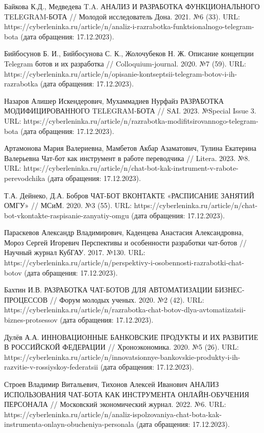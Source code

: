 \documentclass{article}
\begin{document}
Байкова К.Д., Медведева T.A. АНАЛИЗ И РАЗРАБОТКА ФУНКЦИОНАЛЬНОГО TELEGRAM-БОТА // Молодой исследователь Дона. 2021. №6 (33). URL: https://cyberleninka.ru/article/n/analiz-i-razrabotka-funktsionalnogo-telegram-bota (дата обращения: 17.12.2023).

Бийбосунов Б. И., Бийбосунова С. К., Жолочубеков Н. Ж. Описание концепции Telegram ботов и их разработка // Colloquium-journal. 2020. №7 (59). URL: https://cyberleninka.ru/article/n/opisanie-kontseptsii-telegram-botov-i-ih-razrabotka (дата обращения: 17.12.2023).

Назаров Алишер Искендерович, Мухаммадиев Нурфайз РАЗРАБОТКА МОДИФИЦИРОВАННОГО TELEGRAM-БОТА // SAI. 2023. №Special Issue 3. URL: https://cyberleninka.ru/article/n/razrabotka-modifitsirovannogo-telegram-bota (дата обращения: 17.12.2023).

Артамонова Мария Валериевна, Мамбетов Акбар Азаматович, Тулина Екатерина Валерьевна Чат-бот как инструмент в работе переводчика // Litera. 2023. №8. URL: https://cyberleninka.ru/article/n/chat-bot-kak-instrument-v-rabote-perevodchika (дата обращения: 17.12.2023).

Т.А. Дейнеко, Д.А. Бобров ЧАТ-БОТ ВКОНТАКТЕ «РАСПИСАНИЕ ЗАНЯТИЙ ОМГУ» // МСиМ. 2020. №3 (55). URL: https://cyberleninka.ru/article/n/chat-bot-vkontakte-raspisanie-zanyatiy-omgu (дата обращения: 17.12.2023).

Параскевов Александр Владимирович, Каденцева Анастасия Александровна, Мороз Сергей Игоревич Перспективы и особенности разработки чат-ботов // Научный журнал КубГАУ. 2017. №130. URL: https://cyberleninka.ru/article/n/perspektivy-i-osobennosti-razrabotki-chat-botov (дата обращения: 17.12.2023).

Бахтин И.В. РАЗРАБОТКА ЧАТ-БОТОВ ДЛЯ АВТОМАТИЗАЦИИ БИЗНЕС- ПРОЦЕССОВ // Форум молодых ученых. 2020. №2 (42). URL: https://cyberleninka.ru/article/n/razrabotka-chat-botov-dlya-avtomatizatsii-biznes-protsessov (дата обращения: 17.12.2023).

Дулёв А.А. ИННОВАЦИОННЫЕ БАНКОВСКИЕ ПРОДУКТЫ И ИХ РАЗВИТИЕ В РОССИЙСКОЙ ФЕДЕРАЦИИ // Хроноэкономика. 2020. №5 (26). URL: https://cyberleninka.ru/article/n/innovatsionnye-bankovskie-produkty-i-ih-razvitie-v-rossiyskoy-federatsii (дата обращения: 17.12.2023).

Строев Владимир Витальевич, Тихонов Алексей Иванович АНАЛИЗ ИСПОЛЬЗОВАНИЯ ЧАТ-БОТА КАК ИНСТРУМЕНТА ОНЛАЙН-ОБУЧЕНИЯ ПЕРСОНАЛА // Московский экономический журнал. 2022. №6. URL: https://cyberleninka.ru/article/n/analiz-ispolzovaniya-chat-bota-kak-instrumenta-onlayn-obucheniya-personala (дата обращения: 17.12.2023).
\end{document}
